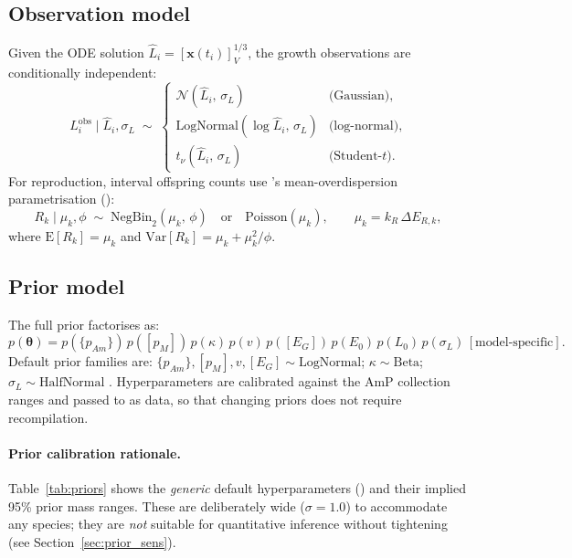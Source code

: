 \documentclass[article,shortnames]{jss}
\newcommand{\pAm}{\{p_{Am}\}}
\newcommand{\pM}{[p_M]}
\newcommand{\EG}{[E_G]}
\begin{document}
\subsection{Observation model}

Given the ODE solution $\hat{L}_i = [\mathbf{x}(t_i)]_V^{1/3}$,
the growth observations are conditionally independent:
\begin{equation}
  L_i^{\mathrm{obs}} \mid \hat{L}_i, \sigma_L \;\sim\;
  \begin{cases}
    \mathcal{N}(\hat{L}_i,\, \sigma_L) & \text{(Gaussian)}, \\
    \mathrm{LogNormal}(\log\hat{L}_i,\, \sigma_L) & \text{(log-normal)}, \\
    t_\nu(\hat{L}_i,\, \sigma_L) & \text{(Student-}t\text{)}.
  \end{cases}
  \label{eq:obs_L}
\end{equation}
For reproduction, interval offspring counts use 's
mean-overdispersion parametrisation
():
\begin{equation}
  R_k \mid \mu_k, \phi \;\sim\;
  \mathrm{NegBin}_2(\mu_k,\, \phi)
  \quad\text{or}\quad
  \mathrm{Poisson}(\mu_k),
  \qquad \mu_k = k_R \, \Delta E_{R,k},
  \label{eq:obs_R}
\end{equation}
where $\mathrm{E}[R_k] = \mu_k$ and $\mathrm{Var}[R_k] = \mu_k +
\mu_k^2 / \phi$.

\subsection{Prior model}

The full prior factorises as:
\begin{equation}
  p(\boldsymbol{\theta}) = p(\pAm) \, p(\pM) \, p(\kappa) \, p(v) \,
  p(\EG) \, p(E_0) \, p(L_0) \, p(\sigma_L) \, [\text{model-specific}].
  \label{eq:prior}
\end{equation}
Default prior families are: $\pAm, \pM, v, \EG \sim
\mathrm{LogNormal}$; $\kappa \sim \mathrm{Beta}$; $\sigma_L \sim
\mathrm{HalfNormal}$ \citep[following the recommendations
of][]{GelmanPriorVariance2006}.  Hyperparameters are calibrated
against the AmP collection ranges \citep{MarquesAmP2018} and passed
to  as data, so that changing priors does not require
recompilation.

\paragraph{Prior calibration rationale.}
Table~\ref{tab:priors} shows the \emph{generic} default
hyperparameters () and their implied 95\%
prior mass ranges.  These are deliberately wide ($\sigma = 1.0$)
to accommodate any species; they are \emph{not} suitable for
quantitative inference without tightening (see
Section~\ref{sec:prior_sens}).
\end{document}
